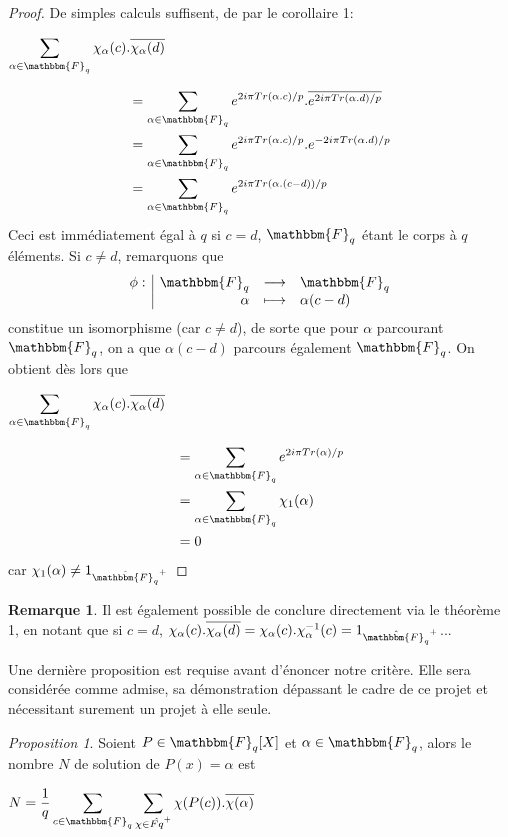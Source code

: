 \documentclass[12pt]{article}
\newcommand{\fonction}[5]{
\begin{displaymath}
\begin{array}{l|rcl}
\displaystyle
#1 : & #2 & \longrightarrow & #3 \\
    & #4 & \longmapsto & #5
\end{array}
\end{displaymath}
}
\theoremstyle{remark}\newtheorem{note}{Note}
\theoremstyle{remark}\newtheorem{nota}{Notation}
\newcommand{\Fq}{\mathbbm{F}_q}
\newtheorem{prop}{Proposition}
\theoremstyle{definition}
\newtheorem{rem}{Remarque}
\begin{document}
\begin{proof}
De simples calculs suffisent, de par le corollaire 1:
\begin{center}$\displaystyle\sum_{\alpha \in \Fq}\chi_\alpha(c).\overline{\chi_\alpha(d)}$\end{center}
\begin{align*} 
&= \displaystyle\sum_{\alpha \in \Fq} e^{2i\pi Tr(\alpha.c)/p}.\overline{e^{2i\pi Tr(\alpha.d)/p}} \\
&= \displaystyle\sum_{\alpha \in \Fq} e^{2i\pi Tr(\alpha.c)/p}.{e^{-2i\pi Tr(\alpha.d)/p}} \\
&= \displaystyle\sum_{\alpha \in \Fq} e^{2i\pi Tr(\alpha.(c-d))/p}
\end{align*} 
Ceci est immédiatement égal à $q$ si $c=d$, $\Fq$ étant le corps à $q$ éléments. Si $c\ne d$, remarquons que \fonction{\phi}{\Fq}{\Fq}{\alpha}{\alpha(c-d)} constitue un isomorphisme (car $c\ne d$), de sorte que pour $\alpha$ parcourant $\Fq$, on a que $\alpha(c-d)$ parcours également $\Fq$. On obtient dès lors que 
\begin{center}$\displaystyle\sum_{\alpha \in \Fq}\chi_\alpha(c).\overline{\chi_\alpha(d)}$\end{center}
\begin{align*} 
&= \displaystyle\sum_{\alpha \in \Fq} e^{2i\pi Tr(\alpha)/p} \\
&= \displaystyle\sum_{\alpha \in \Fq} \chi_1(\alpha) \\
&= 0
\end{align*}
car $\chi_1(\alpha) \ne 1_{\hat{\Fq}^+}$
\end{proof}

\begin{rem}
Il est également possible de conclure directement via le théorème 1, en notant que si $c=d$, $\chi_\alpha(c).\overline{\chi_\alpha(d)} = \chi_\alpha(c).\chi_\alpha^{-1}(c) = 1_{\hat{\Fq}^+}$...
\end{rem}

Une dernière proposition est requise avant d'énoncer notre critère. Elle sera considérée comme admise, sa démonstration dépassant le cadre de ce projet et nécessitant surement un projet à elle seule.

\begin{prop}
Soient $P \in \Fq[X]$ et $\alpha \in \Fq$, alors le nombre $N$ de solution de $P(x) = \alpha$ est \begin{center} $N = \displaystyle \frac{1}{q} \sum_{c\in\Fq}\sum_{\chi \in \hat{Fq}^+} \chi(P(c)).\overline{\chi(\alpha)}$ \end{center}
\end{prop}  
\pagebreak
\end{document}
